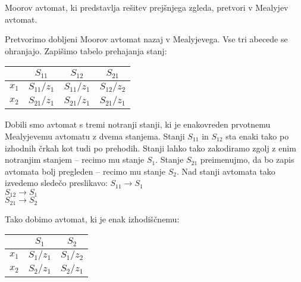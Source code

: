 \begin{zgled}

Moorov avtomat, ki predstavlja rešitev prejšnjega zgleda, pretvori v Mealyjev avtomat.

\end{zgled}

\begin{resitev}

Pretvorimo dobljeni Moorov avtomat nazaj v Mealyjevega. Vse tri abecede se ohranjajo. Zapišimo tabelo prehajanja stanj:

\begin{center}
\begin{tabular}{c|ccc}
 & $S_{11}$ & $S_{12}$ & $S_{21}$\\
\hline
$x_1$ & $S_{11}/z_1$ & $S_{11}/z_1$ & $S_{12}/z_2$\\
$x_2$ & $S_{21}/z_1$ & $S_{21}/z_1$ & $S_{21}/z_1$
\end{tabular}
\end{center}


Dobili smo avtomat s tremi notranji stanji, ki je enakovreden prvotnemu Mealyjevemu avtomatu z dvema stanjema. Stanji $S_{11}$ in $S_{12}$ sta enaki tako po izhodnih črkah kot tudi po prehodih. Stanji lahko tako zakodiramo zgolj z enim notranjim stanjem -- recimo mu stanje $S_1$. Stanje $S_{21}$ preimenujmo, da bo zapis avtomata bolj pregleden -- recimo mu stanje $S_2$. Nad stanji avtomata tako izvedemo sledečo preslikavo:
$S_{11} \rightarrow S_1$\\
$S_{12} \rightarrow S_1$\\
$S_{21} \rightarrow S_2$\\

\bigskip

Tako dobimo avtomat, ki je enak izhodiščnemu:

\begin{center}
\begin{tabular}{c|cc}
 & $S_1$ & $S_2$\\
\hline
$x_1$ & $S_1/z_1$ & $S_1/z_2$\\
$x_2$ & $S_2/z_1$ & $S_2/z_1$
\end{tabular}
\end{center}

\bigskip

\end{resitev}